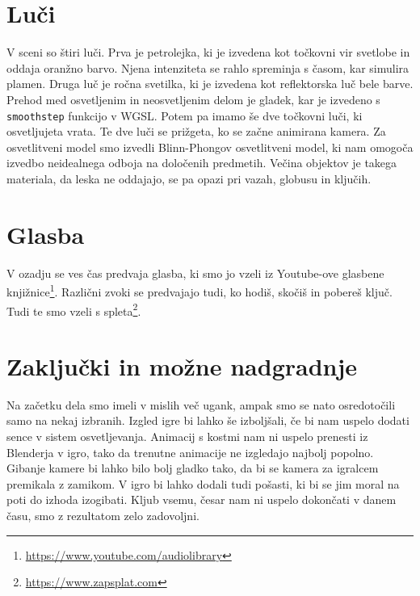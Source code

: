 \documentclass[a4paper,12pt]{article}
\begin{document}
\newpage

\section{Luči}
V sceni so štiri luči. Prva je petrolejka, ki je izvedena kot točkovni vir svetlobe in oddaja oranžno barvo. Njena intenziteta se rahlo spreminja s časom, kar simulira plamen. Druga luč je ročna svetilka, ki je izvedena kot reflektorska luč bele barve. Prehod med osvetljenim in neosvetljenim delom je gladek, kar je izvedeno s \verb+smoothstep+ funkcijo v WGSL. Potem pa imamo še dve točkovni luči, ki osvetljujeta vrata. Te dve luči se prižgeta, ko se začne animirana kamera.
Za osvetlitveni model smo izvedli Blinn-Phongov osvetlitveni model, ki nam omogoča izvedbo neidealnega odboja na določenih predmetih. Večina objektov je takega materiala, da leska ne oddajajo, se pa opazi pri vazah, globusu in ključih.

\section{Glasba}
V ozadju se ves čas predvaja glasba, ki smo jo vzeli iz Youtube-ove glasbene knjižnice\footnote{\url{https://www.youtube.com/audiolibrary}}. Različni zvoki se predvajajo tudi, ko hodiš, skočiš in pobereš ključ. Tudi te smo vzeli s spleta\footnote{\url{https://www.zapsplat.com}}.

\section{Zaključki in možne nadgradnje}
Na začetku dela smo imeli v mislih več ugank, ampak smo se nato osredotočili samo na nekaj izbranih. Izgled igre bi lahko še izboljšali, če bi nam uspelo dodati sence v sistem osvetljevanja. Animacij s kostmi nam ni uspelo prenesti iz Blenderja v igro, tako da trenutne animacije ne izgledajo najbolj popolno. Gibanje kamere bi lahko bilo bolj gladko tako, da bi se kamera za igralcem premikala z zamikom. V igro bi lahko dodali tudi pošasti, ki bi se jim moral na poti do izhoda izogibati.
Kljub vsemu, česar nam ni uspelo dokončati v danem času, smo z rezultatom zelo zadovoljni.
\end{document}
